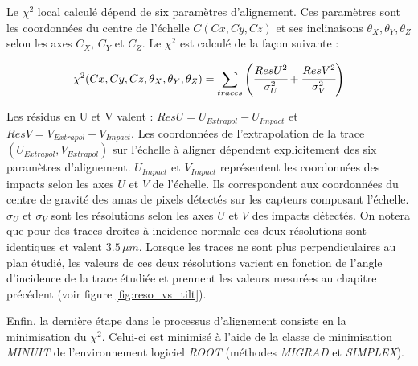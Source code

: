    Le $\chi^2$ local calcul\'e d\'epend de six param\`etres d'alignement. Ces param\`etres sont les coordonn\'ees du centre de l'\'echelle $C(Cx, Cy, Cz)$ et ses inclinaisons $\theta_X, \theta_Y, \theta_Z$ selon les axes $C_X$, $C_Y$ et $C_Z$. Le $\chi^2$ est calcul\'e de la fa\c{c}on suivante :

   \begin{equation}
    \chi^2 (Cx, Cy, Cz, \theta_X, \theta_Y, \theta_Z) = \sum_{traces} \left( \cfrac{ResU^2}{\sigma_U^2} + \cfrac{ResV^2}{\sigma_V^2} \right)
   \end{equation}

   

   Les r\'esidus en U et V valent : $ResU = U_{Extrapol} - U_{Impact}$ et $ResV = V_{Extrapol} - V_{Impact}$. Les coordonn\'ees de l'extrapolation de la trace $(U_{Extrapol}, V_{Extrapol})$ sur l'\'echelle \`a aligner d\'ependent explicitement des six param\`etres d'alignement. $U_{Impact}$ et $V_{Impact}$ repr\'esentent les coordonn\'ees des impacts selon les axes $U$ et $V$ de l'\'echelle. Ils correspondent aux coordonn\'ees du centre de gravit\'e des amas de pixels d\'etect\'es sur les capteurs composant l'\'echelle. $\sigma_U$ et $\sigma_V$ sont les r\'esolutions selon les axes $U$ et $V$ des impacts d\'etect\'es. On notera que pour des traces droites \`a incidence normale ces deux r\'esolutions sont identiques et valent $3.5 \, \mu m$. Lorsque les traces ne sont plus perpendiculaires au plan \'etudi\'e, les valeurs de ces deux r\'esolutions varient en fonction de l'angle d'incidence de la trace \'etudi\'ee et prennent les valeurs mesur\'ees au chapitre pr\'ec\'edent (voir figure \ref{fig:reso_vs_tilt}).
   
   \medskip
   
   Enfin, la dernière \'etape dans le processus d'alignement consiste en la minimisation du $\chi^2$. Celui-ci est minimis\'e \`a l'aide de la classe de minimisation \textit{MINUIT} de l'environnement logiciel \textit{ROOT} (m\'ethodes \textit{MIGRAD} et \textit{SIMPLEX}).
   
